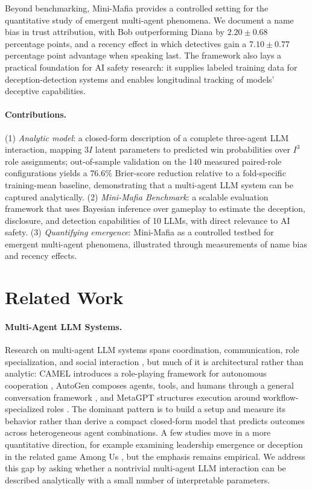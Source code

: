 \documentclass[sigconf,anonymous,balance=false]{aamas}
\begin{document}
Beyond benchmarking, Mini-Mafia provides a controlled setting for the quantitative study of emergent multi-agent phenomena. We document a name bias in trust attribution, with Bob outperforming Diana by $2.20 \pm 0.68$ percentage points, and a recency effect in which detectives gain a $7.10 \pm 0.77$ percentage point advantage when speaking last. The framework also lays a practical foundation for AI safety research: it supplies labeled training data for deception-detection systems and enables longitudinal tracking of models' deceptive capabilities.

\paragraph{Contributions.} (1) \textit{Analytic model}: a closed-form description of a complete three-agent LLM interaction, mapping $3I$ latent parameters to predicted win probabilities over $I^3$ role assignments; out-of-sample validation on the 140 measured paired-role configurations yields a $76.6\%$ Brier-score reduction relative to a fold-specific training-mean baseline, demonstrating that a multi-agent LLM system can be captured analytically. (2) \textit{Mini-Mafia Benchmark}: a scalable evaluation framework that uses Bayesian inference over gameplay to estimate the deception, disclosure, and detection capabilities of 10 LLMs, with direct relevance to AI safety. (3) \textit{Quantifying emergence}: Mini-Mafia as a controlled testbed for emergent multi-agent phenomena, illustrated through measurements of name bias and recency effects.



\section{Related Work}
\label{sec:related_work}

\paragraph{Multi-Agent LLM Systems.} Research on multi-agent LLM systems spans coordination, communication, role specialization, and social interaction \citep{gao2024large, guo2024large, wang2024survey, hou2024egosocialarena}, but much of it is architectural rather than analytic: CAMEL introduces a role-playing framework for autonomous cooperation \citep{li2023camel}, AutoGen composes agents, tools, and humans through a general conversation framework \citep{wu2023autogen}, and MetaGPT structures execution around workflow-specialized roles \citep{hong2023metagpt}. The dominant pattern is to build a setup and measure its behavior rather than derive a compact closed-form model that predicts outcomes across heterogeneous agent combinations. A few studies move in a more quantitative direction, for example examining leadership emergence \citep{du2024helmsman} or deception in the related game Among Us \citep{bansal2025amonus}, but the emphasis remains empirical. We address this gap by asking whether a nontrivial multi-agent LLM interaction can be described analytically with a small number of interpretable parameters.
\end{document}
